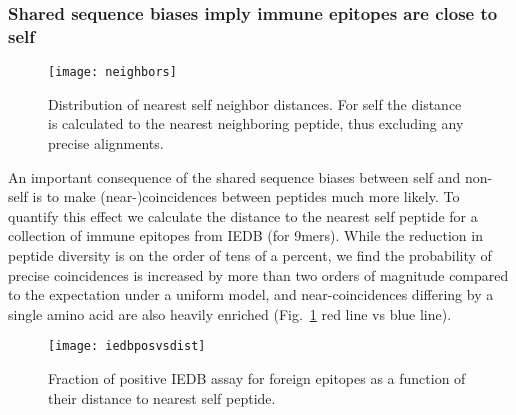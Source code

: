 \documentclass[superscriptaddress,twocolumn,pre]{revtex4}
\newcommand{\<}{\langle}
\renewcommand{\>}{\rangle}
\begin{document}


\subsubsection{Shared sequence biases imply immune epitopes are close to self}

\begin{figure}
    \texttt{[image: neighbors]}
    \caption{Distribution of nearest self neighbor distances. For self the distance is calculated to the nearest neighboring peptide, thus excluding any precise alignments.
    \label{figneighbors}
    }
\end{figure}

An important consequence of the shared sequence biases between self and non-self is to make (near-)coincidences between peptides much more likely. To quantify this effect we calculate the distance to the nearest self peptide for a collection of immune epitopes from IEDB (for 9mers). While the reduction in peptide diversity is on the order of tens of a percent, we find the probability of precise coincidences is increased by more than two orders of magnitude compared to the expectation under a uniform model, and near-coincidences differing by a single amino acid are also heavily enriched (Fig.~\ref{figneighbors} red line vs blue line).

\begin{figure}
    \texttt{[image: iedbposvsdist]}
    \caption{Fraction of positive IEDB assay for foreign epitopes as a function of their distance to nearest self peptide.
    \label{figiedbposvsdist}
    }
\end{figure}
\end{document}

